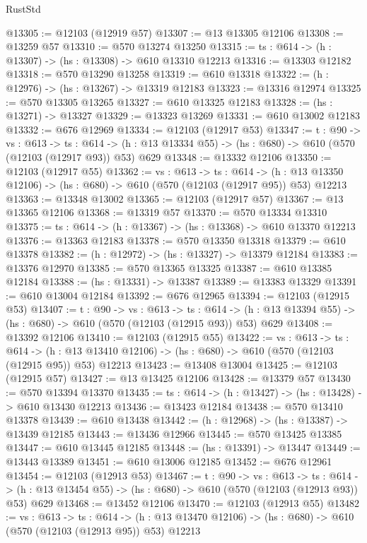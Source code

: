 \begin{lexlean}{RustStd}
\begin{coremodule}
@13305 := @12103 (@12919 @57)
@13307 := @13 @13305 @12106
@13308 := @13259 @57
@13310 := @570 @13274 @13250
@13315 := {ts : @614} -> (h : @13307) -> (hs : @13308) -> @610 @13310 @12213
@13316 := @13303 @12182
@13318 := @570 @13290 @13258
@13319 := @610 @13318
@13322 := (h : @12976) -> (hs : @13267) -> @13319 @12183
@13323 := @13316 @12974
@13325 := @570 @13305 @13265
@13327 := @610 @13325 @12183
@13328 := (hs : @13271) -> @13327
@13329 := @13323 @13269
@13331 := @610 @13002 @12183
@13332 := @676 @12969
@13334 := @12103 (@12917 @53)
@13347 := {t : @90} ->
  {vs : @613} ->
  {ts : @614} -> (h : @13 @13334 @55) -> (hs : @680) -> @610 (@570 (@12103 (@12917 @93)) @53) @629
@13348 := @13332 @12106
@13350 := @12103 (@12917 @55)
@13362 := {vs : @613} ->
  {ts : @614} ->
  (h : @13 @13350 @12106) -> (hs : @680) -> @610 (@570 (@12103 (@12917 @95)) @53) @12213
@13363 := @13348 @13002
@13365 := @12103 (@12917 @57)
@13367 := @13 @13365 @12106
@13368 := @13319 @57
@13370 := @570 @13334 @13310
@13375 := {ts : @614} -> (h : @13367) -> (hs : @13368) -> @610 @13370 @12213
@13376 := @13363 @12183
@13378 := @570 @13350 @13318
@13379 := @610 @13378
@13382 := (h : @12972) -> (hs : @13327) -> @13379 @12184
@13383 := @13376 @12970
@13385 := @570 @13365 @13325
@13387 := @610 @13385 @12184
@13388 := (hs : @13331) -> @13387
@13389 := @13383 @13329
@13391 := @610 @13004 @12184
@13392 := @676 @12965
@13394 := @12103 (@12915 @53)
@13407 := {t : @90} ->
  {vs : @613} ->
  {ts : @614} -> (h : @13 @13394 @55) -> (hs : @680) -> @610 (@570 (@12103 (@12915 @93)) @53) @629
@13408 := @13392 @12106
@13410 := @12103 (@12915 @55)
@13422 := {vs : @613} ->
  {ts : @614} ->
  (h : @13 @13410 @12106) -> (hs : @680) -> @610 (@570 (@12103 (@12915 @95)) @53) @12213
@13423 := @13408 @13004
@13425 := @12103 (@12915 @57)
@13427 := @13 @13425 @12106
@13428 := @13379 @57
@13430 := @570 @13394 @13370
@13435 := {ts : @614} -> (h : @13427) -> (hs : @13428) -> @610 @13430 @12213
@13436 := @13423 @12184
@13438 := @570 @13410 @13378
@13439 := @610 @13438
@13442 := (h : @12968) -> (hs : @13387) -> @13439 @12185
@13443 := @13436 @12966
@13445 := @570 @13425 @13385
@13447 := @610 @13445 @12185
@13448 := (hs : @13391) -> @13447
@13449 := @13443 @13389
@13451 := @610 @13006 @12185
@13452 := @676 @12961
@13454 := @12103 (@12913 @53)
@13467 := {t : @90} ->
  {vs : @613} ->
  {ts : @614} -> (h : @13 @13454 @55) -> (hs : @680) -> @610 (@570 (@12103 (@12913 @93)) @53) @629
@13468 := @13452 @12106
@13470 := @12103 (@12913 @55)
@13482 := {vs : @613} ->
  {ts : @614} ->
  (h : @13 @13470 @12106) -> (hs : @680) -> @610 (@570 (@12103 (@12913 @95)) @53) @12213

\end{coremodule}
\end{lexlean}
